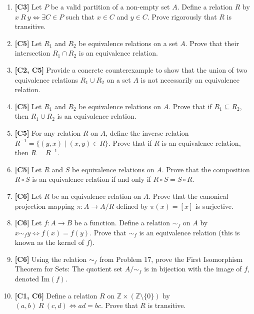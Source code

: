 \documentclass[11pt, a4paper]{article}
\theoremstyle{definition}
\theoremstyle{remark}
\newcommand{\Z}{\mathbb{Z}}
\begin{document}
\begin{enumerate}[label=\textbf{\arabic*.}, leftmargin=*]
    \item \textbf{[C3]} Let $P$ be a valid partition of a non-empty set $A$. Define a relation $R$ by $x \ R \ y \iff \exists C \in P$ such that $x \in C$ and $y \in C$. Prove rigorously that $R$ is transitive.
    
    \item \textbf{[C5]} Let $R_1$ and $R_2$ be equivalence relations on a set $A$. Prove that their intersection $R_1 \cap R_2$ is an equivalence relation.
    
    \item \textbf{[C2, C5]} Provide a concrete counterexample to show that the union of two equivalence relations $R_1 \cup R_2$ on a set $A$ is not necessarily an equivalence relation.
    
    \item \textbf{[C5]} Let $R_1$ and $R_2$ be equivalence relations on $A$. Prove that if $R_1 \subseteq R_2$, then $R_1 \cup R_2$ is an equivalence relation.
    
    \item \textbf{[C5]} For any relation $R$ on $A$, define the inverse relation $R^{-1} = \{(y, x) \mid (x, y) \in R\}$. Prove that if $R$ is an equivalence relation, then $R = R^{-1}$.
    
    \item \textbf{[C5]} Let $R$ and $S$ be equivalence relations on $A$. Prove that the composition $R \circ S$ is an equivalence relation if and only if $R \circ S = S \circ R$.
    
    \item \textbf{[C6]} Let $R$ be an equivalence relation on $A$. Prove that the canonical projection mapping $\pi: A \to A/R$ defined by $\pi(x) = [x]$ is surjective.
    
    \item \textbf{[C6]} Let $f: A \to B$ be a function. Define a relation $\sim_f$ on $A$ by $x \sim_f y \iff f(x) = f(y)$. Prove that $\sim_f$ is an equivalence relation (this is known as the kernel of $f$).
    
    \item \textbf{[C6]} Using the relation $\sim_f$ from Problem 17, prove the First Isomorphism Theorem for Sets: The quotient set $A/\sim_f$ is in bijection with the image of $f$, denoted $\text{Im}(f)$.
    
    \item \textbf{[C1, C6]} Define a relation $R$ on $\Z \times (\Z \setminus \{0\})$ by $(a, b) \ R \ (c, d) \iff ad = bc$. Prove that $R$ is transitive.
    

\end{enumerate}
\end{document}

